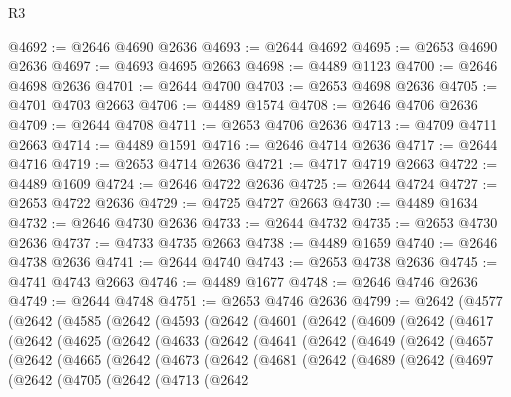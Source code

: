 \begin{lexlean}{R3}
\begin{coremodule}
@4692 := @2646 @4690 @2636
@4693 := @2644 @4692
@4695 := @2653 @4690 @2636
@4697 := @4693 @4695 @2663
@4698 := @4489 @1123
@4700 := @2646 @4698 @2636
@4701 := @2644 @4700
@4703 := @2653 @4698 @2636
@4705 := @4701 @4703 @2663
@4706 := @4489 @1574
@4708 := @2646 @4706 @2636
@4709 := @2644 @4708
@4711 := @2653 @4706 @2636
@4713 := @4709 @4711 @2663
@4714 := @4489 @1591
@4716 := @2646 @4714 @2636
@4717 := @2644 @4716
@4719 := @2653 @4714 @2636
@4721 := @4717 @4719 @2663
@4722 := @4489 @1609
@4724 := @2646 @4722 @2636
@4725 := @2644 @4724
@4727 := @2653 @4722 @2636
@4729 := @4725 @4727 @2663
@4730 := @4489 @1634
@4732 := @2646 @4730 @2636
@4733 := @2644 @4732
@4735 := @2653 @4730 @2636
@4737 := @4733 @4735 @2663
@4738 := @4489 @1659
@4740 := @2646 @4738 @2636
@4741 := @2644 @4740
@4743 := @2653 @4738 @2636
@4745 := @4741 @4743 @2663
@4746 := @4489 @1677
@4748 := @2646 @4746 @2636
@4749 := @2644 @4748
@4751 := @2653 @4746 @2636
@4799 := @2642
    (@4577
      (@2642
        (@4585
          (@2642
            (@4593
              (@2642
                (@4601
                  (@2642
                    (@4609
                      (@2642
                        (@4617
                          (@2642
                            (@4625
                              (@2642
                                (@4633
                                  (@2642
                                    (@4641
                                      (@2642
                                        (@4649
                                          (@2642
                                            (@4657
                                              (@2642
                                                (@4665
                                                  (@2642
                                                    (@4673
                                                      (@2642
                                                        (@4681
                                                          (@2642
                                                            (@4689
                                                              (@2642
                                                                (@4697
                                                                  (@2642
                                                                    (@4705
                                                                      (@2642
                                                                        (@4713
                                                                          (@2642

\end{coremodule}
\end{lexlean}
